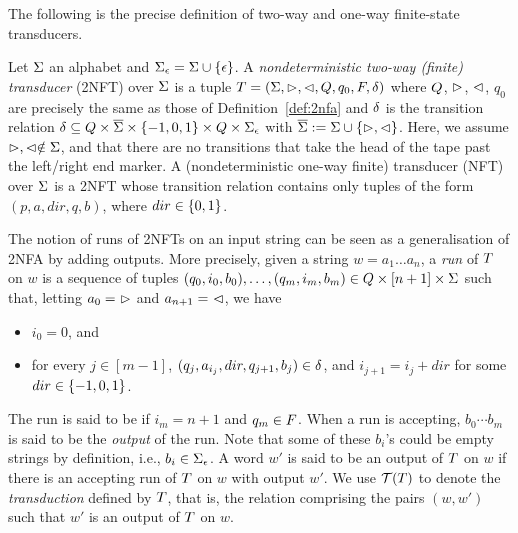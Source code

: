 The following is the precise definition
of two-way and one-way finite-state transducers.
\begin{definition}
    Let $\Sigma$ an alphabet and $\Sigma_\epsilon = \Sigma
    \cup \{\epsilon\}$.
    A \emph{nondeterministic two-way (finite) \emph{transducer}} (2NFT) over 
    $\Sigma$ is a tuple $T = (\Sigma, \vartriangleright, \vartriangleleft, Q, q_0, F, \delta)$ where  $Q$, $\vartriangleright$, $\vartriangleleft$, $q_0$ are precisely the same as those of Definition~\ref{def:2nfa}
%
and 
    $\delta$ is the
transition relation  $\delta\subseteq Q \times 
    \overline{\Sigma}\times \{-1, 0, 1\}\times 
    Q \times \Sigma_\epsilon$ with
    $\overline{\Sigma} := \Sigma \cup \{\vartriangleright,\vartriangleleft\}$.
    Here, we assume $\vartriangleright, \vartriangleleft \notin \Sigma$, and that
    there are no transitions that take the head of the tape past the left/right
    end marker. 
    A (nondeterministic one-way finite) transducer (NFT) over
    $\Sigma$
    is a 2NFT whose transition relation contains only tuples of the form
    $(p,a,dir,q,b)$, where $dir \in \{0,1\}$.
\end{definition}



The notion of runs of 2NFTs on an input string can be seen as a generalisation 
of 2NFA by adding outputs. More precisely, given a string $w = a_1 \dots a_n$, a \emph{run} of $T$ on $w$
is a
sequence of tuples $(q_0, i_0, b_0),\ldots, (q_m, i_m, b_m) \in Q \times
[n+1] \times \Sigma$ 
such that, letting $a_0 =\ \vartriangleright$ and $a_{n+1} =\ \vartriangleleft$, 
we have %
\begin{itemize}
    \item $i_0 = 0$, and
    \item for every $j \in [m-1]$, $(q_j, a_{i_j}, dir, q_{j+1}, b_j) \in
        \delta$, and $i_{j+1} = i_j + dir$ for some $dir \in \{-1, 0, 1\}$.
\end{itemize}
The run is said to be  if $i_m = n+1$ and $q_m \in F$.
When a run is accepting, $b_0 \cdots b_m$ is said to be the \emph{output} of the
run. Note that some of these $b_i$'s could be empty strings by definition, i.e.,
$b_i \in \Sigma_\epsilon$.
A word $w'$ is said to be an output of $T$ on $w$ if there is an accepting run of
$T$ on $w$ with output $w'$. We use $\mathcal{T}(T)$ to denote the
\emph{transduction} defined by $T$, that is, the relation comprising
the pairs $(w,w')$ such that $w'$ is an output of $T$ on $w$. 

